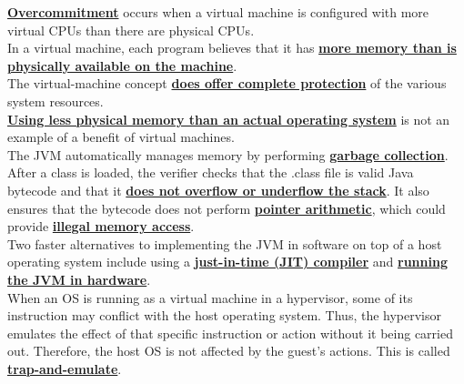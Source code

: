 \documentclass[10pt]{article}
\newcommand{\qw}[1]{\textbf{\ul{#1}}}
\begin{document}
\qw{Overcommitment} occurs when a virtual machine is configured with more virtual CPUs than there are physical CPUs.\\[2mm]
In a virtual machine, each program believes that it has \qw{more memory than is physically available on the machine}.\\[2mm]
The virtual-machine concept \qw{does offer complete protection} of the various system resources.\\[2mm]
\qw{Using less physical memory than an actual operating system} is not an example of a benefit of virtual machines.\\[2mm]
The JVM automatically manages memory by performing \qw{garbage collection}. After a class is loaded, the verifier checks that the .class file is valid Java bytecode and that it \qw{does not overflow or underflow the stack}. It also ensures that the bytecode does not perform \qw{pointer arithmetic}, which could provide \qw{illegal memory access}.\\[2mm]
Two faster alternatives to implementing the JVM in software on top of a host operating system include using a \qw{just-in-time (JIT) compiler} and \qw{running the JVM in hardware}.\\[2mm]
When an OS is running as a virtual machine in a hypervisor, some of its instruction may conflict with the host operating system. Thus, the hypervisor emulates the effect of that specific instruction or action without it being carried out. Therefore, the host OS is not affected by the guest's actions. This is called \qw{trap-and-emulate}.\\[2mm]
\newpage
\end{document}
